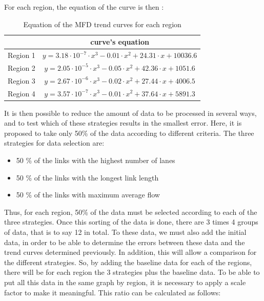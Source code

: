 \documentclass[a4paper, 12pt,oneside]{article}
\begin{document}
For each region, the equation of the curve is then :

\begin{table}[H]
\begin{center}
\begin{tabular}{|c|c|}
\hline   & curve's equation\\
\hline Region 1 & $y=3.18 \cdot 10^{-7} \cdot x^3 - 0.01\cdot x^2 + 24.31 \cdot x + 10036.6$\\
\hline Region 2 & $y=2.05  \cdot 10^{-5} \cdot x^3 - 0.05 \cdot x^2 + 42.36 \cdot x + 1051.6$\\
\hline Region 3 & $y=2.67  \cdot 10^{-6} \cdot x^3 - 0.02 \cdot x^2 + 27.44 \cdot x + 4006.5$\\
\hline Region 4 & $y=3.57  \cdot 10^{-7} \cdot x^3 - 0.01 \cdot x^2 + 37.64 \cdot x + 5891.3$\\
\hline
\end{tabular}
\caption{Equation of the MFD trend curves for each region}
\label{Equation of the MFD trend curves for each region}
\end{center}
\end{table}

It is then possible to reduce the amount of data to be processed in several ways, and to test which of these strategies results in the smallest error. Here, it is proposed to take only 50\% of the data according to different criteria.
The three strategies for data selection are:
\begin{itemize}
    \item 50 \% of the links with the highest number of lanes
    \item 50 \% of the links with the longest link length
    \item 50 \% of the links with maximum average flow
\end{itemize}

Thus, for each region, 50\% of the data must be selected according to each of the three strategies. Once this sorting of the data is done, there are 3 times 4 groups of data, that is to say 12 in total. To these data, we must also add the initial data, in order to be able to determine the errors between these data and the trend curves determined previously. In addition, this will allow a comparison for the different strategies. So, by adding the baseline data for each of the regions, there will be for each region the 3 strategies plus the baseline data. To be able to put all this data in the same graph by region, it is necessary to apply a scale factor to make it meaningful. This ratio can be calculated as follows: 
\end{document}

